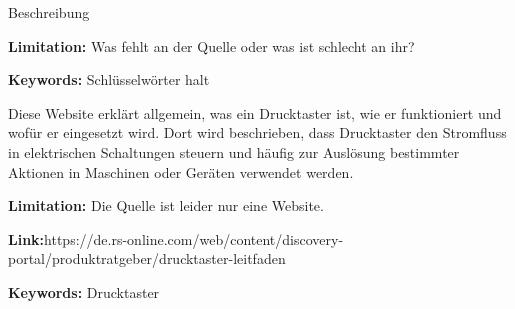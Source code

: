 %
%
%
%





{ 
	Beschreibung 
	
	\bigskip
	
	\textbf{Limitation:} Was fehlt an der Quelle oder was ist schlecht an ihr?
	
	\scriptsize{\textbf{Keywords:} Schlüsselwörter halt}
}


{ 
	Diese Website erklärt allgemein, was ein Drucktaster ist, wie er funktioniert und wofür er eingesetzt wird. Dort wird beschrieben, dass Drucktaster den Stromfluss in elektrischen Schaltungen steuern und häufig zur Auslösung bestimmter Aktionen in Maschinen oder Geräten verwendet werden.
	
	\bigskip
	
	\textbf{Limitation:} Die Quelle ist leider nur eine Website.
	
	\textbf{Link:}https://de.rs-online.com/web/content/discovery-portal/produktratgeber/drucktaster-leitfaden
	
	\scriptsize{\textbf{Keywords:} Drucktaster}
}

